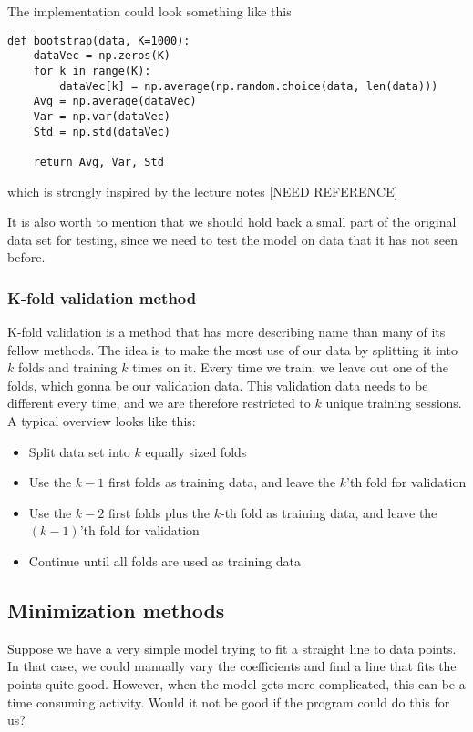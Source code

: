 The implementation could look something like this
\lstset{basicstyle=\scriptsize}
\begin{lstlisting}
def bootstrap(data, K=1000):
    dataVec = np.zeros(K)
    for k in range(K):
        dataVec[k] = np.average(np.random.choice(data, len(data)))
    Avg = np.average(dataVec)
    Var = np.var(dataVec)
    Std = np.std(dataVec)
    
    return Avg, Var, Std
\end{lstlisting}
which is strongly inspired by the lecture notes [NEED REFERENCE]

It is also worth to mention that we should hold back a small part of the original data set for testing, since we need to test the model on data that it has not seen before.

\subsubsection{K-fold validation method} \label{sec:kfold}
K-fold validation is a method that has more describing name than many of its fellow methods. The idea is to make the most use of our data by splitting it into $k$ folds and training $k$ times on it. Every time we train, we leave out one of the folds, which gonna be our validation data. This validation data needs to be different every time, and we are therefore restricted to $k$ unique training sessions. A typical overview looks like this:
\begin{itemize}
	\item Split data set into $k$ equally sized folds
	\item Use the $k-1$ first folds as training data, and leave the $k$'th fold for validation
	\item Use the $k-2$ first folds plus the $k$-th fold as training data, and leave the $(k-1)$'th fold for validation
	\item Continue until all folds are used as training data
\end{itemize}

\cite{Berkeley}

\subsection{Minimization methods} \label{sec:minimization}
Suppose we have a very simple model trying to fit a straight line to data points. In that case, we could manually vary the coefficients and find a line that fits the points quite good. However, when the model gets more complicated, this can be a time consuming activity. Would it not be good if the program could do this for us?

